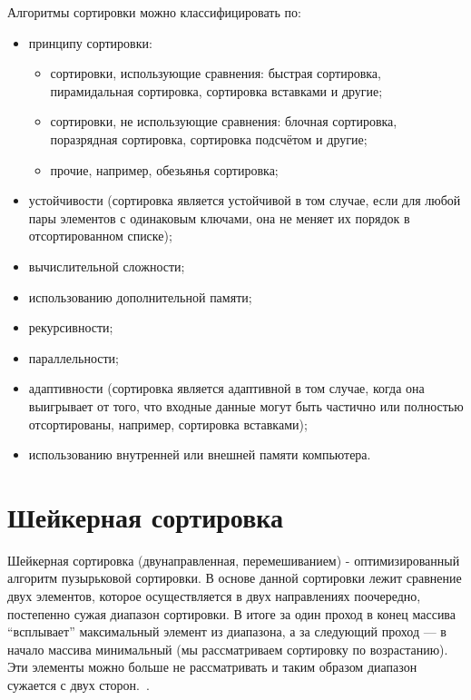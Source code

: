 \documentclass[12pt]{report}
\begin{document}
    Алгоритмы сортировки можно классифицировать по:
    \begin{itemize}
        \item принципу сортировки:
        \begin{itemize}
            \item сортировки, использующие сравнения:
            быстрая сортировка, пирамидальная сортировка, сортировка вставками и другие;
            \item сортировки, не использующие сравнения:
            блочная сортировка, поразрядная сортировка, сортировка подсчётом и другие;
            \item прочие, например, обезьянья сортировка;
        \end{itemize}
        \item устойчивости (сортировка является устойчивой в том случае,
        если для любой пары элементов с одинаковым ключами,
        она не меняет их порядок в отсортированном списке);
        \item вычислительной сложности;
        \item использованию дополнительной памяти;
        \item рекурсивности;
        \item параллельности;
        \item адаптивности (сортировка является адаптивной в том случае,
        когда она выигрывает от того, что входные данные могут быть частично или полностью отсортированы,
        например, сортировка вставками);
        \item использованию внутренней или внешней памяти компьютера.
    \end{itemize}


    \section{Шейкерная сортировка}
    Шейкерная сортировка (двунаправленная, перемешиванием) - оптимизированный алгоритм пузырьковой сортировки.
    В основе данной сортировки лежит сравнение двух элементов,
    которое осуществляется в двух направлениях поочередно, постепенно сужая диапазон сортировки.
    В итоге за один проход в конец массива “всплывает” максимальный элемент из диапазона,
    а за следующий проход — в начало массива минимальный (мы рассматриваем сортировку по возрастанию).
    Эти элементы можно больше не рассматривать и таким образом диапазон сужается с двух сторон.~\cite{Shaker}.
\end{document}
